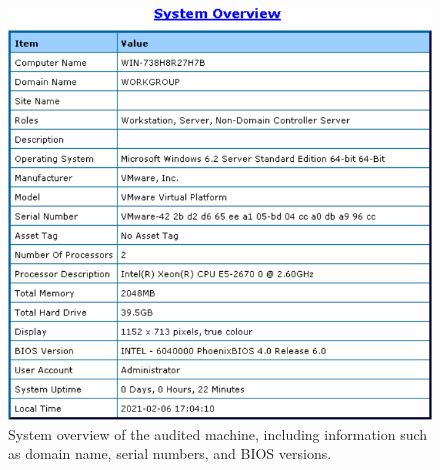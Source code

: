 \begin{figure}[H]
    \centering
    \includegraphics[width=0.8\linewidth]{figures/pic9.png}
    \caption{System overview of the audited machine, including information such as domain name, serial numbers, and BIOS versions.}
\end{figure}

